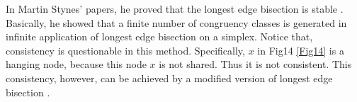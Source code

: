 In Martin Stynes' papers, he proved that the longest edge bisection is stable \cite{stynes1979faster,stynes1980faster,stynes1979n}. Basically, he showed that a finite number of congruency classes is generated in infinite application of longest edge bisection on a simplex. Notice that, consistency is questionable in this method. Specifically, $x$ in Fig14 \ref{Fig14} is a hanging node, because this node $x$ is not shared. Thus it is not consistent. This consistency, however, can be achieved by a modified version of longest edge bisection \cite{kˇriˇzek1997generate}.


